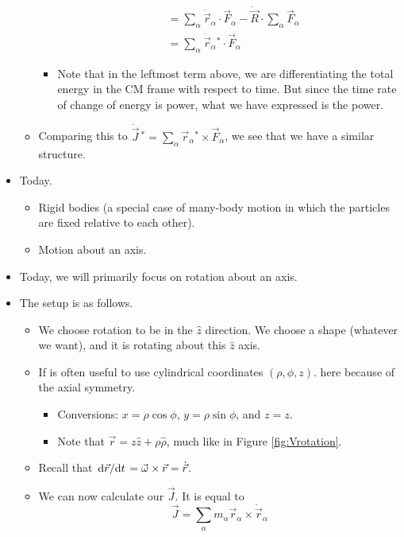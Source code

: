 \documentclass[../notes.tex]{subfiles}
\begin{document}
\begin{itemize}
\begin{itemize}
\begin{itemize}
\begin{align*}
                &= \sum_\alpha\dot{\vec{r}}_\alpha\cdot\vec{F}_\alpha-\dot{\vec{R}}\cdot\sum_\alpha\vec{F}_\alpha\\
                &= \sum_\alpha\dot{\vec{r}}_\alpha{}^*\cdot\vec{F}_\alpha
            \end{align*}
            \item Note that in the leftmost term above, we are differentiating the total energy in the CM frame with respect to time. But since the time rate of change of energy is power, what we have expressed is the power.
        \end{itemize}
        \item Comparing this to $\dot{\vec{J}}{\,}^*=\sum_\alpha\vec{r}_\alpha{}^*\times\vec{F}_\alpha$, we see that we have a similar structure.
    \end{itemize}
    \item Today.
    \begin{itemize}
        \item Rigid bodies (a special case of many-body motion in which the particles are fixed relative to each other).
        \item Motion about an axis.
    \end{itemize}
    \item Today, we will primarily focus on rotation about an axis.
    \item The setup is as follows.
    \begin{itemize}
        \item We choose rotation to be in the $\hat{z}$ direction. We choose a shape (whatever we want), and it is rotating about this $\hat{z}$ axis.
        \item If is often useful to use cylindrical coordinates $(\rho,\phi,z)$. here because of the axial symmetry.
        \begin{itemize}
            \item Conversions: $x=\rho\cos\phi$, $y=\rho\sin\phi$, and $z=z$.
            \item Note that $\vec{r}=z\hat{z}+\rho\hat{\rho}$, much like in Figure \ref{fig:Vrotation}.
        \end{itemize}
        \item Recall that $\dv*{\vec{r}}{t}=\vec{\omega}\times\vec{r}=\dot{\vec{r}}$.
        \item We can now calculate our $\vec{J}$. It is equal to
        \begin{equation*}
            \vec{J} = \sum_\alpha m_\alpha\vec{r}_\alpha\times\dot{\vec{r}}_\alpha

\end{equation*}
\end{itemize}
\end{itemize}
\end{document}
